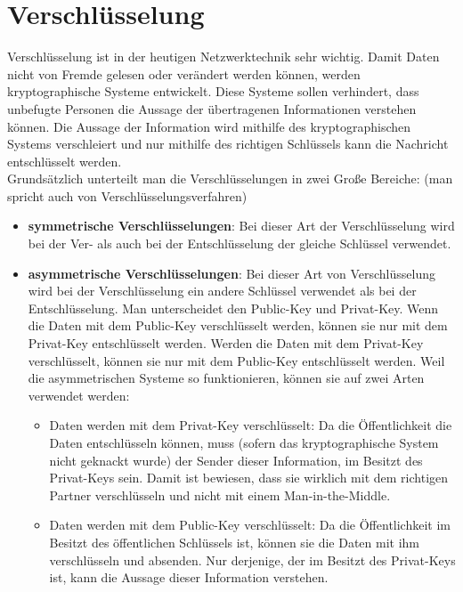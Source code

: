 \section{Verschlüsselung}

Verschlüsselung ist in der heutigen Netzwerktechnik sehr wichtig. Damit Daten nicht von Fremde gelesen oder verändert werden können, werden kryptographische Systeme entwickelt. Diese Systeme sollen verhindert, dass unbefugte Personen die Aussage der übertragenen Informationen verstehen können. Die Aussage der Information wird mithilfe des kryptographischen Systems verschleiert und nur mithilfe des richtigen Schlüssels kann die Nachricht entschlüsselt werden.\\

Grundsätzlich unterteilt man die Verschlüsselungen in zwei Große Bereiche: (man spricht auch von Verschlüsselungsverfahren)

\begin{itemize}
\item \textbf{symmetrische Verschlüsselungen}: Bei dieser Art der Verschlüsselung wird bei der Ver- als auch bei der Entschlüsselung der gleiche Schlüssel verwendet.
\item \textbf{asymmetrische Verschlüsselungen}: Bei dieser Art von Verschlüsselung wird bei der Verschlüsselung ein andere Schlüssel verwendet als bei der Entschlüsselung. Man unterscheidet den Public-Key und Privat-Key. Wenn die Daten mit dem Public-Key verschlüsselt werden, können sie nur mit dem Privat-Key entschlüsselt werden. Werden die Daten mit dem Privat-Key verschlüsselt, können sie nur mit dem Public-Key entschlüsselt werden. Weil die asymmetrischen Systeme so funktionieren, können sie auf zwei Arten verwendet werden:

  \begin{itemize}
	\item Daten werden mit dem Privat-Key verschlüsselt: Da die Öffentlichkeit die Daten entschlüsseln können, muss (sofern das kryptographische System nicht geknackt wurde) der Sender dieser Information, im Besitzt des Privat-Keys sein. Damit ist bewiesen, dass sie wirklich mit dem richtigen Partner verschlüsseln und nicht mit einem Man-in-the-Middle.
	\item Daten werden mit dem Public-Key verschlüsselt: Da die Öffentlichkeit im Besitzt des öffentlichen Schlüssels ist, können sie die Daten mit ihm verschlüsseln und absenden. Nur derjenige, der im Besitzt des Privat-Keys ist, kann die Aussage dieser Information verstehen.
  \end{itemize}

\end{itemize}


